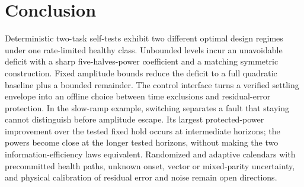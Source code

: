 \documentclass[journal]{IEEEtran}
\theoremstyle{definition}\newtheorem{definition}{Definition}
\theoremstyle{remark}\newtheorem{remark}{Remark}
\begin{document}
\section{Conclusion}
Deterministic two-task self-tests exhibit two different optimal design regimes under one rate-limited healthy class. Unbounded levels incur an unavoidable deficit with a sharp five-halves-power coefficient and a matching symmetric construction. Fixed amplitude bounds reduce the deficit to a full quadratic baseline plus a bounded remainder. The control interface turns a verified settling envelope into an offline choice between time exclusions and residual-error protection. In the slow-ramp example, switching separates a fault that staying cannot distinguish before amplitude escape. Its largest protected-power improvement over the tested fixed hold occurs at intermediate horizons; the powers become close at the longer tested horizons, without making the two information-efficiency laws equivalent. Randomized and adaptive calendars with precommitted health paths, unknown onset, vector or mixed-parity uncertainty, and physical calibration of residual error and noise remain open directions.
\appendices






\end{document}
